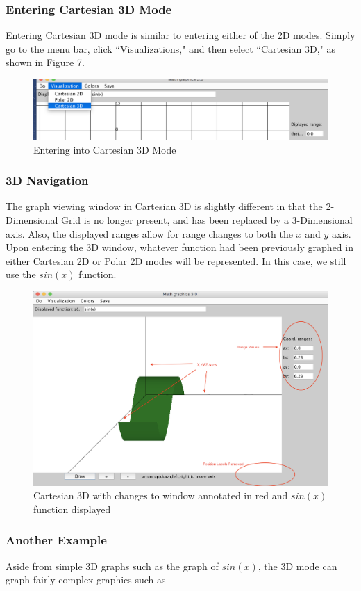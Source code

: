 \documentclass{article}[12 pt]
\begin{document}
		\subsubsection{Entering Cartesian 3D Mode}
		Entering Cartesian 3D mode is similar to entering either of the 2D modes. Simply go to the menu bar, click ``Visualizations," and then select ``Cartesian 3D," as shown in Figure 7.
			\begin{figure}[h!]
			\centering
			\includegraphics[scale = .35]{enter3D}
			\caption{Entering into Cartesian 3D Mode}
			\end{figure}
		\pagebreak
		
		\subsubsection{3D Navigation}
		The graph viewing window in Cartesian 3D is slightly different in that the 2-Dimensional Grid is no longer present, and has been replaced by a 3-Dimensional axis. Also, the displayed ranges allow for range changes to both the $x$ and $y$ axis. Upon entering the 3D window, whatever function had been previously graphed in either Cartesian 2D or Polar 2D modes will be represented. In this case, we still use the $sin(x)$ function. 
			\begin{figure}[h!]
			\centering
			\includegraphics[scale=.35]{3DView}
			\caption{Cartesian 3D with changes to window annotated in red and $sin(x)$ function displayed}
			\end{figure}
			
		\subsubsection{Another Example}
		Aside from simple 3D graphs such as the graph of $sin(x)$, the 3D mode can graph fairly complex graphics such as 
			
\end{document}
